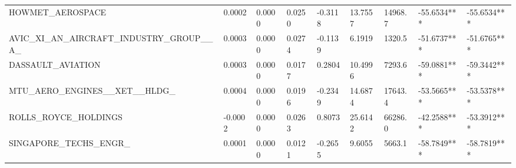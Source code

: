 \documentclass[
  letterpaper,
  DIV=11,
  numbers=noendperiod]{scrartcl}
\begin{document}
\begin{table}[H]
{\begin{tabular}[t]{lllllllll}
\addlinespace
HOWMET\_AEROSPACE & 0.0002 & 0.0000 & 0.0250 & -0.3118 & 13.7557 & 14968.7 & -55.6534*** & -55.6534***\\
AVIC\_XI\_AN\_AIRCRAFT\_INDUSTRY\_GROUP\_\_A\_ & 0.0003 & 0.0000 & 0.0274 & -0.1139 & 6.1919 & 1320.5 & -51.6737*** & -51.6765***\\
DASSAULT\_AVIATION & 0.0003 & 0.0000 & 0.0177 & 0.2804 & 10.4996 & 7293.6 & -59.0881*** & -59.3442***\\
MTU\_AERO\_ENGINES\_\_XET\_\_HLDG\_ & 0.0004 & 0.0000 & 0.0196 & -0.2349 & 14.6874 & 17643.4 & -53.5665*** & -53.5378***\\
ROLLS\_ROYCE\_HOLDINGS & -0.0002 & 0.0000 & 0.0263 & 0.8073 & 25.6142 & 66286.0 & -42.2588*** & -53.3912***\\
\addlinespace
SINGAPORE\_TECHS\_ENGR\_ & 0.0001 & 0.0000 & 0.0121 & -0.2655 & 9.6055 & 5663.1 & -58.7849*** & -58.7819***\\
\bottomrule
\end{tabular}}
\end{table}
\end{document}
